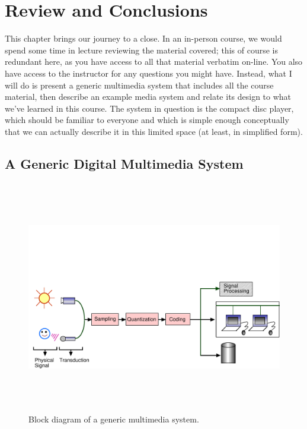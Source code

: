 
%
%
%

\chapter{Review and Conclusions}
\label{ch:review}

This chapter brings our journey to a close. In an in-person course, we
would spend some time in lecture reviewing the material covered; this
of course is redundant here, as you have access to all that material
verbatim on-line. You also have access to the instructor for any
questions you might have. Instead, what I will do is present a generic
multimedia system that includes all the course material, then describe
an example media system and relate its design to what we've learned in
this course. The system in question is the compact disc player, which
should be familiar to everyone and which is simple enough conceptually
that we can actually describe it in this limited space (at least, in
simplified form).

\section{A Generic Digital Multimedia System}

\begin{figure}
\centerline{\includegraphics[height=4in,angle=-90]{ch-rev/fig10-1}}
\caption{Block diagram of a generic multimedia system.\label{fg:genmmsys}}
\end{figure}

